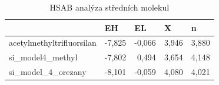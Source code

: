 \documentclass[
  digital, %
  table,   %
  lof,     %
  lot,     %
  oneside,
]{fithesis3}
\begin{document}
\begin{table}[htbp]
\caption{HSAB analýza středních molekul}
\begin{center}
\begin{tabular}{|l|r|r|r|r|}
\hline
 & \multicolumn{1}{l|}{EH} & \multicolumn{1}{l|}{EL} & \multicolumn{1}{l|}{X} & \multicolumn{1}{l|}{n} \\ \hline
acetylmethyltrifluorsilan & -7,825 & -0,066 & 3,946 & 3,880 \\ \hline
si\_model4\_methyl & -7,802 & 0,494 & 3,654 & 4,148 \\ \hline
si\_model\_4\_orezany & -8,101 & -0,059 & 4,080 & 4,021 \\ \hline
\end{tabular}
\end{center}
\label{hsab_middle}
\end{table}
\end{document}
